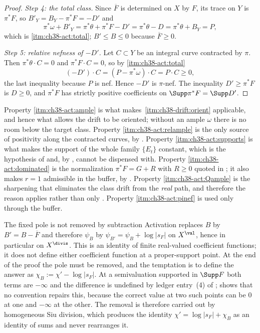 \begin{proof}
\emph{Step 4: the total class.}
Since $\overline F$ is determined on $X$ by $F$, its trace on $Y$
is $\pi^*F$, so $B'_Y=B_Y-\pi^*F=-D'$ and
\[
 \pi^*\omega+B'_Y=\pi^*\theta+\pi^*F-D'=\pi^*\theta-D=\pi^*\theta+B_Y=P,
\]
which is \cref{itm:ch38-act:total}; $B'\leq B\leq0$ because
$\overline F\geq0$.

\emph{Step 5: relative nefness of $-D'$.}
Let $C\subset Y$ be an integral curve contracted by $\pi$.  Then
$\pi^*\theta\cdot C=0$ and $\pi^*F\cdot C=0$, so by
\cref{itm:ch38-act:total}
\[
 (-D')\cdot C=(P-\pi^*\omega)\cdot C=P\cdot C\geq0 ,
\]
the last inequality because $P$ is nef.  Hence $-D'$ is $\pi$-nef.
The inequality $D'\geq\pi^*F$ is $D\geq0$, and $\pi^*F$ has strictly
positive coefficients on $\Supp\pi^*F=\Supp D'$.
\end{proof}

\begin{remark}
\label{rem:ch38-activation-uses}
Property \cref{itm:ch38-act:ample} is what makes
\,\cref{itm:ch38-drift:orient} applicable, and
hence what allows the drift to be oriented; without an ample $\omega$
there is no room below the target class.  Property
\cref{itm:ch38-act:relample} is the only source of positivity along the
contracted curves, by .  Property
\cref{itm:ch38-act:supports} is what makes the support of the whole family
$\{E_t\}$ constant, which is the hypothesis of
 and, by
, cannot be dispensed with.  Property
\cref{itm:ch38-act:dominated} is the normalization
$\pi^*F=G+R$ with $R\geq0$ quoted in
; it also makes $r=1$ admissible in the buffer,
by .  Property \cref{itm:ch38-act:Qample} is the
sharpening that eliminates the class drift from the \emph{real} path, and
therefore the reason  applies
rather than only .  Property
\cref{itm:ch38-act:pinef} is used only through the buffer.
\end{remark}

\begin{warning}{The fixed pole is not removed by subtraction}
\label{warn:ch38-fixed-pole}
Activation replaces $B$ by $B'=B-\overline F$ and therefore
$\psi_B$ by
$\psi_{B'}=\psi_B+\log|s_F|$ on $X^{\val}$, hence in particular on
$X^{\divis}$.  This is an identity of finite real-valued coefficient
functions; it does not define either coefficient function at a
proper-support point.  At the end of the proof the pole must be removed,
and the
temptation is to define the answer as
$\chi_{B}:=\chi'-\log|s_F|$.  At a semivaluation supported in
$\Supp F$ both terms are $-\infty$ and the difference is undefined by
ledger entry~(4) of ;
 shows that no convention repairs
this, because the correct value at two such points can be $0$ at one and
$-\infty$ at the other.  The removal is therefore carried out by
homogeneous Siu division, which produces the identity
$\chi'=\log|s_F|+\chi_B$ as an identity of sums and never rearranges it.
\end{warning}

